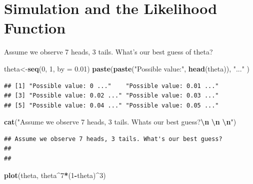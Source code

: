 \documentclass[
]{book}
\newenvironment{Shaded}{\begin{snugshade}}{\end{snugshade}}
\newcommand{\AttributeTok}[1]{\textcolor[rgb]{0.13,0.29,0.53}{#1}}
\newcommand{\DecValTok}[1]{\textcolor[rgb]{0.00,0.00,0.81}{#1}}
\newcommand{\FloatTok}[1]{\textcolor[rgb]{0.00,0.00,0.81}{#1}}
\newcommand{\FunctionTok}[1]{\textcolor[rgb]{0.13,0.29,0.53}{\textbf{#1}}}
\newcommand{\NormalTok}[1]{#1}
\newcommand{\OtherTok}[1]{\textcolor[rgb]{0.56,0.35,0.01}{#1}}
\newcommand{\SpecialCharTok}[1]{\textcolor[rgb]{0.81,0.36,0.00}{\textbf{#1}}}
\newcommand{\StringTok}[1]{\textcolor[rgb]{0.31,0.60,0.02}{#1}}
\begin{document}
\section{Simulation and the Likelihood Function}\label{simulation-and-the-likelihood-function}

Assume we observe 7 heads, 3 tails. What's our best guess of theta?

\begin{Shaded}
\begin{Highlighting}[]
\NormalTok{theta}\OtherTok{\textless{}{-}}\FunctionTok{seq}\NormalTok{(}\DecValTok{0}\NormalTok{, }\DecValTok{1}\NormalTok{, }\AttributeTok{by =} \FloatTok{0.01}\NormalTok{)}
\FunctionTok{paste}\NormalTok{(}\FunctionTok{paste}\NormalTok{(}\StringTok{"Possible value:"}\NormalTok{, }\FunctionTok{head}\NormalTok{(theta)), }\StringTok{"..."}\NormalTok{ )}
\end{Highlighting}
\end{Shaded}

\begin{verbatim}
## [1] "Possible value: 0 ..."    "Possible value: 0.01 ..."
## [3] "Possible value: 0.02 ..." "Possible value: 0.03 ..."
## [5] "Possible value: 0.04 ..." "Possible value: 0.05 ..."
\end{verbatim}

\begin{Shaded}
\begin{Highlighting}[]
\FunctionTok{cat}\NormalTok{(}\StringTok{"Assume we observe 7 heads, 3 tails. What\textquotesingle{}s our best guess?}\SpecialCharTok{\textbackslash{}n}\StringTok{ }\SpecialCharTok{\textbackslash{}n}\StringTok{ }\SpecialCharTok{\textbackslash{}n}\StringTok{"}\NormalTok{)}
\end{Highlighting}
\end{Shaded}

\begin{verbatim}
## Assume we observe 7 heads, 3 tails. What's our best guess?
##  
## 
\end{verbatim}

\begin{Shaded}
\begin{Highlighting}[]
\FunctionTok{plot}\NormalTok{(theta, theta}\SpecialCharTok{\^{}}\DecValTok{7}\SpecialCharTok{*}\NormalTok{(}\DecValTok{1}\SpecialCharTok{{-}}\NormalTok{theta)}\SpecialCharTok{\^{}}\DecValTok{3}\NormalTok{)}
\end{Highlighting}
\end{Shaded}
\end{document}
